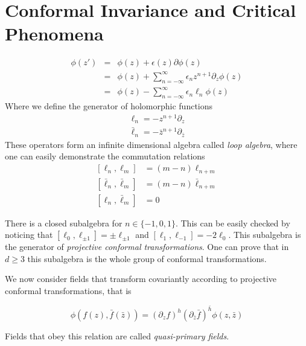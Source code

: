 \chapter{Conformal Invariance and Critical Phenomena}
\label{ch:conf}

\begin{eqnarray*}
    \phi\left(z'\right) & = & \phi\left(z\right)+
                              \epsilon\left(z\right)\partial\phi\left(z\right)\\
                        & = & \phi\left(z\right)+
                              \sum_{n=-\infty}^{\infty}\epsilon_{n}z^{n+1}
                              \partial_{z}\phi\left(z\right)\\
                        & = & \phi\left(z\right)-
                              \sum_{n=-\infty}^{\infty}\epsilon_{n}\ell_{n}
                              \phi\left(z\right)
\end{eqnarray*}
Where we define the generator of holomorphic functions
\begin{align*}
    \ell_{n}=-z^{n+1}\partial_{z} \\
    \bar{\ell}_{n}=-\bar{z}^{n+1}\partial_{\bar{z}}
\end{align*}
These operators form an infinite dimensional algebra called \textit{loop
algebra}, where one can easily demonstrate the commutation relations
\begin{align}
    \left[\ell_{n},\ell_{m}\right]&=(m-n)\ell_{n+m}\\
    \left[\bar{\ell}_{n},\bar{\ell}_{m}\right]&=(m-n)\bar{\ell}_{n+m}\\
    \left[\ell_{n},\bar{\ell}_{m}\right]&=0
\end{align}

There is a closed subalgebra for $n\in\{-1, 0, 1\}$. This can be easily checked
by noticing that $[\ell_0,\ell_{\pm 1}] = \pm\ell_{\pm 1}$ and $[\ell_1,
\ell_{-1}] = -2\ell_0$. This subalgebra is the generator of \textit{projective
conformal transformations}. One can prove that in $d\ge3$ this subalgebra
is the whole group of conformal transformations.

We now consider fields that transform covariantly according to projective
conformal transformations, that is

\begin{equation}
    \phi\left(f\left(z\right),\bar{f}\left(\bar{z}\right)\right)=
    (\partial_{z}f)^{h}(\partial_{\bar{z}}\bar{f})^{\bar{h}}\phi\left(z,\bar{z}\right)
\end{equation}

Fields that obey this relation are called \textit{quasi-primary fields}.
